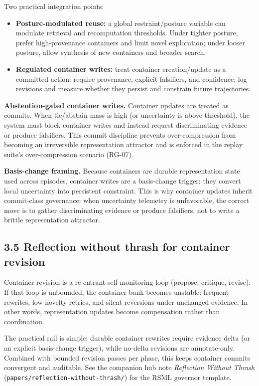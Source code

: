 \documentclass[11pt]{article}
\begin{document}
Two practical integration points:
\begin{itemize}
\item \textbf{Posture-modulated reuse:} a global restraint/posture variable can modulate retrieval and recomputation thresholds. Under tighter posture, prefer high-provenance containers and limit novel exploration; under looser posture, allow synthesis of new containers and broader search.
\item \textbf{Regulated container writes:} treat container creation/update as a committed action: require provenance, explicit falsifiers, and confidence; log revisions and measure whether they persist and constrain future trajectories.
\end{itemize}
\noindent\textbf{Abstention-gated container writes.} Container updates are treated as commits. When tie/abstain mass is high (or uncertainty is above threshold), the system must block container writes and instead request discriminating evidence or produce falsifiers. This commit discipline prevents over-compression from becoming an irreversible representation attractor and is enforced in the replay suite's over-compression scenario (RG-07).

\noindent\textbf{Basis-change framing.}
Because containers are durable representation state used across episodes, container writes are a basis-change trigger: they convert local uncertainty into persistent constraint.
This is why container updates inherit commit-class governance: when uncertainty telemetry is unfavorable, the correct move is to gather discriminating evidence or produce falsifiers, not to write a brittle representation attractor.

\subsection*{3.5 Reflection without thrash for container revision}
Container revision is a re-entrant self-monitoring loop (propose, critique, revise). If that loop is unbounded, the container bank becomes unstable: frequent rewrites, low-novelty retries, and silent reversions under unchanged evidence. In other words, representation updates become compensation rather than coordination.

The practical rail is simple: durable container rewrites require evidence delta (or an explicit basis-change trigger), while no-delta revisions are annotate-only. Combined with bounded revision passes per phase, this keeps container commits convergent and auditable. See the companion hub note \emph{Reflection Without Thrash} (\texttt{papers/reflection-without-thrash/}) for the RSML governor template.
\end{document}
